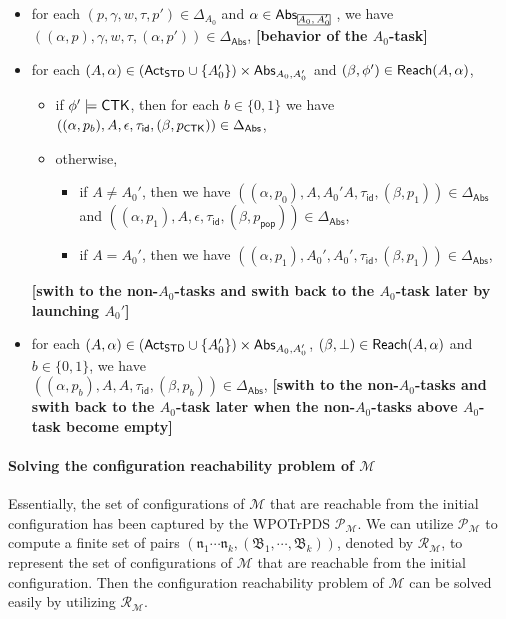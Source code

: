 \documentclass[preprint,12pt]{elsarticle}
\newcommand\rectangled[1]{\tikz[baseline=(torect.base)]{
    \node[shape = rectangle, draw, inner sep=0pt, outer sep = 0pt] (torect) {#1}
    }
}
\newcommand{\mrectangled}[1]{\text{\rectangled{\ensuremath{#1}}}}
\newcommand{\mhcancel}[1]{\mrectangled{#1}}
\newcommand\Mm{{\mathcal{M} }}
\newcommand\Pp{{\mathcal{P} }}
\newcommand\act{{\sf Act}}
\newcommand\standard{{\sf STD}}
\newcommand\ctkflag{{\sf CTK}}
\newcommand\abs{{\mathsf{Abs} }}
\newcommand\aname{\mathfrak{n}}
\newcommand\AutReach{\mathscr{R}}
\newcommand\reach{{\sf Reach}}
\newcommand{\id}{\mathsf{id}}
\newcommand\AutB{{\mathfrak{B} }}
\newcommand{\WOTrPDS}{\textsf{WPOTrPDS}}
\newcommand\pop{\mathsf{pop}}
\begin{document}
{\begin{itemize}
    \item for each $(p,\gamma,w,\tau,p')\in\Delta_{A_0}$ and $\alpha\in\abs_{\mhcancel{A_0,A_0'}}$, we have $((\alpha,p),\gamma,w,\tau,(\alpha,p'))\in\Delta_{\abs}$, \textbf{[behavior of the $A_0$-task]}
    \item for each $(A,\alpha)\in(\act_{\standard}\cup\{A_0'\})\times\abs_{A_0,A_0'}$ and $(\beta,\phi')\in\reach(A,\alpha)$, 
        \begin{itemize}
            \item if $\phi' \models \ctkflag$, then for each $b \in \{0,1\}$ we have $((\alpha,p_b),A,\epsilon,\tau_{\id},(\beta,p_{\ctkflag}))\in\Delta_{\abs}$,
            \item otherwise,
            \begin{itemize}
                \item if $A\neq A_0'$, then we have
                    $((\alpha,p_0),A,A_0'A,\tau_{\id},(\beta,p_1))\in\Delta_{\abs}$ and $((\alpha,p_1),A,\epsilon,\tau_{\id},(\beta,p_{\pop}))\in\Delta_{\abs}$,
                \item if $A=A_0'$, then we have $((\alpha,p_1),A_0',A_0',\tau_{\id},(\beta,p_1))\in\Delta_{\abs}$,
            \end{itemize}
        \end{itemize}
                \textbf{[swith to the non-$A_0$-tasks and swith back to the $A_0$-task later by launching $A_0'$]}
    \item for each $(A,\alpha)\in(\act_{\standard}\cup\{A_0'\})\times\abs_{A_0,A_0'}$, $(\beta,\bot)\in\reach(A,\alpha)$ and $b\in\{0,1\}$, we have \\
        $((\alpha,p_b),A,A,\tau_{\id},(\beta,p_b))\in\Delta_{\abs}$,
            \textbf{[swith to the non-$A_0$-tasks and swith back to the $A_0$-task later when the non-$A_0$-tasks above $A_0$-task become empty]}
\end{itemize}
}


\paragraph{Solving the configuration reachability problem of $\Mm$} 
Essentially, the set of configurations of $\Mm$ that are reachable from the initial configuration  has been captured by the {\WOTrPDS} $\Pp_\Mm$.
We can utilize $\Pp_\Mm$ to compute a finite set of pairs $(\aname_1 \cdots \aname_k, (\AutB_1, \cdots, \AutB_k))$, denoted by $\AutReach_\Mm$,  to represent the set of configurations of $\Mm$ that are reachable from the initial configuration. Then the configuration reachability problem of $\Mm$ can be solved easily by utilizing $\AutReach_\Mm$. 
\end{document}
